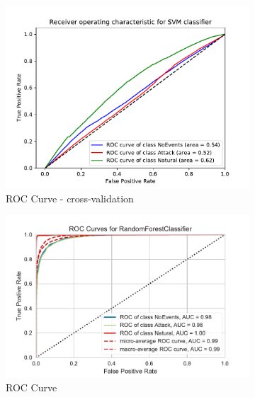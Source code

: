 \begin{figure}[H]
    \centering
    \begin{subfigure}[t]{0.33\textwidth}
        \centering
        \includegraphics[page=1, width=\linewidth]{images/results_scikit/SVM}
        \caption{ROC Curve - cross-validation}
        \label{fig:scikit_SVM_ROC}
    \end{subfigure}
    \begin{subfigure}[t]{0.33\textwidth}
        \centering
        \includegraphics[page=2, width=\linewidth]{images/roc_3c}
        \caption{ROC Curve}
        \label{fig:scikit_RF_ROC}
    \end{subfigure}
    \begin{subfigure}[t]{0.3\textwidth}
        \centering

\end{subfigure}
\end{figure}

